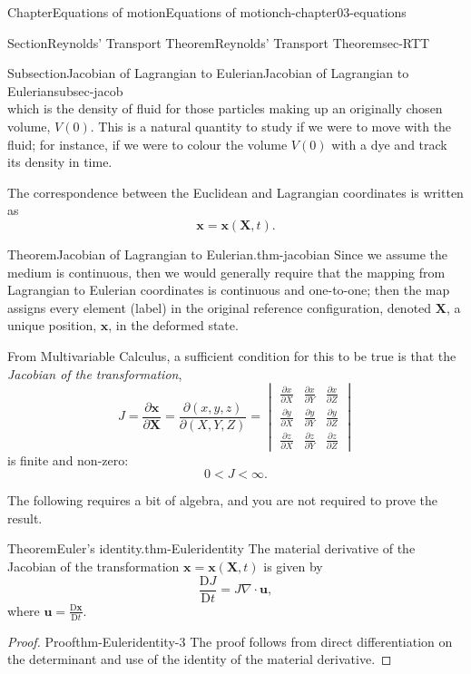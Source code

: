 \documentclass[oneside,10pt,]{book}
\numberwithin{equation}{section}
\newcommand{\DD}[2]{\frac{\mathrm{D}#1}{\mathrm{D}#2}}
\newcommand{\pd}[2]{\frac{\partial#1}{\partial#2}}
\newcommand{\bx}{\boldsymbol{x}}
\newcommand{\bX}{\boldsymbol{X}}
\newcommand{\bu}{\boldsymbol{u}}
\newcommand{\lt}{<}
\begin{document}
\begin{chapterptx}{Chapter}{Equations of motion}{}{Equations of motion}{}{}{ch-chapter03-equations}
\begin{sectionptx}{Section}{Reynolds' Transport Theorem}{}{Reynolds' Transport Theorem}{}{}{sec-RTT}
\begin{subsectionptx}{Subsection}{Jacobian of Lagrangian to Eulerian}{}{Jacobian of Lagrangian to Eulerian}{}{}{subsec-jacob}
\begin{equation*}
\end{equation*}
which is the density of fluid for those particles making up an originally chosen volume, \(V(0)\). This is a natural quantity to study if we were to move with the fluid; for instance, if we were to colour the volume \(V(0)\) with a dye and track its density in time.%
\par
The correspondence between the Euclidean and Lagrangian coordinates is written as%
\begin{equation*}
\bx = \bx(\bX, t).
\end{equation*}
%
\begin{theorem}{Theorem}{Jacobian of Lagrangian to Eulerian.}{}{thm-jacobian}%
Since we assume the medium is continuous, then we would generally require that the mapping from Lagrangian to Eulerian coordinates is continuous and one-to-one; then the map assigns every element (label) in the original reference configuration, denoted \(\bX\), a unique position, \(\bx\), in the deformed state.%
\par
From Multivariable Calculus, a sufficient condition for this to be true is that the \emph{Jacobian of the transformation},%
\begin{equation*}
J = \pd{\bx}{\bX} = \pd{(x, y, z)}{(X, Y, Z)} =
\begin{vmatrix}
\pd{x}{X} & \pd{x}{Y} & \pd{x}{Z} \\
\pd{y}{X} & \pd{y}{Y} & \pd{y}{Z} \\
\pd{z}{X} & \pd{z}{Y} & \pd{z}{Z}
\end{vmatrix}
\end{equation*}
is finite and non-zero:%
\begin{equation*}
0 \lt J \lt \infty.
\end{equation*}
%
\end{theorem}
The following requires a bit of algebra, and you are not required to prove the result.%
\begin{theorem}{Theorem}{Euler's identity.}{}{thm-Euleridentity}%
The material derivative of the Jacobian of the transformation \(\bx = \bx(\bX, t)\) is given by%
\begin{equation}
\DD{J}{t} = J \nabla \cdot \bu,\label{eqn-euler-identity}
\end{equation}
where \(\bu =
\DD{\bx}{t}\).%
\end{theorem}
\begin{proof}{Proof}{}{thm-Euleridentity-3}
The proof follows from direct differentiation on the determinant and use of the identity of the material derivative.%

\end{proof}
\end{subsectionptx}
\end{sectionptx}
\end{chapterptx}
\end{document}
